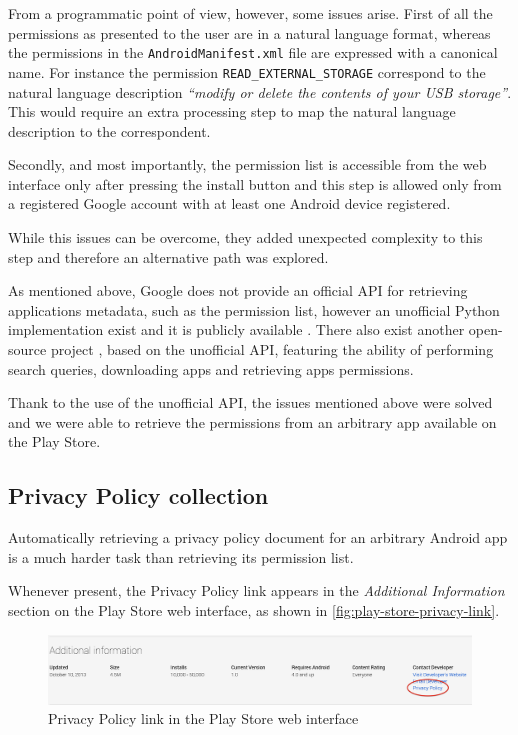 \documentclass[twoside,letterpaper]{soups}
\theoremstyle{definition}
\begin{document}
From a programmatic point of view, however, some issues arise. First of all the permissions as presented to the user are in a natural language format, whereas the permissions in the \texttt{AndroidManifest.xml} file are expressed with a canonical name. For instance the permission \texttt{READ\_EXTERNAL\_STORAGE} correspond to the natural language description \emph{``modify or delete the contents of your USB storage''}.
This would require an extra processing step to map the natural language description to the correspondent.

Secondly, and most importantly, the permission list is accessible from the web interface only after pressing the install button and this step is allowed only from a registered Google account with at least one Android device registered.

While this issues can be overcome, they added unexpected complexity to this step and therefore an alternative path was explored.

As mentioned above, Google does not provide an official API for retrieving applications metadata, such as the permission list, however an unofficial Python implementation exist and it is publicly available \cite{play-store-unofficial-api}. There also exist another open-source project \cite{play-store-crawler}, based on the unofficial API, featuring the ability of performing search queries, downloading apps and retrieving apps permissions.

Thank to the use of the unofficial API, the issues mentioned above were solved and we were able to retrieve the permissions from an arbitrary app available on the Play Store.

\subsection{Privacy Policy collection}
\label{sec:pp-collection}
Automatically retrieving a privacy policy document for an arbitrary Android app is a much harder task than retrieving its permission list.

Whenever present, the Privacy Policy link appears in the \emph{Additional Information} section on the Play Store web interface, as shown in \autoref{fig:play-store-privacy-link}.

\begin{figure}[b!]
\centering
     \includegraphics[width=\textwidth]{images/play-store-privacy-link}
      \caption{Privacy Policy link in the Play Store web interface}
      \label{fig:play-store-privacy-link}
\end{figure}
\end{document}
